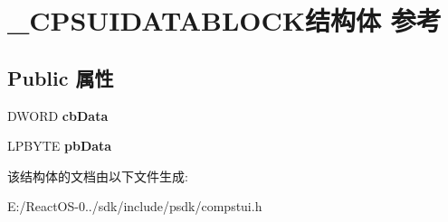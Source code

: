 \hypertarget{struct___c_p_s_u_i_d_a_t_a_b_l_o_c_k}{}\section{\+\_\+\+C\+P\+S\+U\+I\+D\+A\+T\+A\+B\+L\+O\+C\+K结构体 参考}
\label{struct___c_p_s_u_i_d_a_t_a_b_l_o_c_k}
\subsection*{Public 属性}
\begin{DoxyCompactItemize}
\item 
\mbox{\label{struct___c_p_s_u_i_d_a_t_a_b_l_o_c_k_ae37839c6888672fe240c4be90586dbc3}} 
D\+W\+O\+RD {\bfseries cb\+Data}
\item 
\mbox{\label{struct___c_p_s_u_i_d_a_t_a_b_l_o_c_k_a1f24cc691681f4320d3022ee467ebcfb}} 
L\+P\+B\+Y\+TE {\bfseries pb\+Data}
\end{DoxyCompactItemize}


该结构体的文档由以下文件生成\+:\begin{DoxyCompactItemize}
\item 
E\+:/\+React\+O\+S-\/0../sdk/include/psdk/compstui.\+h\end{DoxyCompactItemize}

